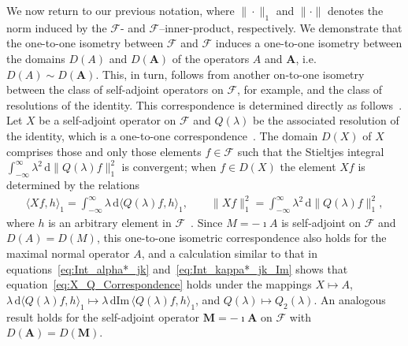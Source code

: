 \documentclass[leqno,onefignum,onetabnum]{siamltex1213}
\renewcommand{\d}{\mathrm{d}}
\newcommand{\Mb}{\mathbf{M}}
\newcommand{\Ab}{\mathbf{A}}
\newcommand{\Fc}{\mathcal{F}}
\newcommand{\Fs}{\mathscr{F}}
\begin{document}
We now return to our previous notation, where $\|\cdot\|_1$ and $\|\cdot\|$
denotes the norm induced by the $\Fs$- and $\Fc$--inner-product, 
respectively. We demonstrate that the one-to-one isometry between
$\Fs$ and $\Fc$ induces a one-to-one isometry between the domains
$D(A)$ and $D(\Ab)$ of the operators $A$ and $\Ab$,
i.e. $D(A)\sim D(\Ab)$. This, in turn, follows from another on-to-one
isometry between the class of self-adjoint operators on $\Fs$, for
example, and the class of resolutions of the identity. This 
correspondence is determined directly as follows~\cite{Stone:64}. Let
$X$ be a self-adjoint operator on $\Fs$ and $Q(\lambda)$ be the associated
resolution of the identity, which is a one-to-one
correspondence~\cite{Stone:64}. The domain $D(X)$ of $X$ comprises
those and only 
those elements $f\in\Fs$ such that the Stieltjes integral
$\int_{-\infty}^\infty\lambda^2\,\d\|Q(\lambda)f\|_1^2$ is convergent; when $f\in D(X)$ the element
$Xf$ is determined by the relations    
%
\begin{align}%
  \langle Xf,h\rangle_1=\int_{-\infty}^\infty\lambda\,\d\langle Q(\lambda)f,h\rangle_1, \qquad
  \|Xf\|_1^2=\int_{-\infty}^\infty\lambda^2\,\d\|Q(\lambda)f\|_1^2,
\end{align}
%
where $h$ is an arbitrary element in $\Fs$~\cite{Stone:64}. Since
$M=-\imath A$ is 
self-adjoint on $\Fs$ and $D(A)=D(M)$, this one-to-one isometric
correspondence also holds for the maximal normal operator $A$, and a
calculation similar to that in equations~\eqref{eq:Int_alpha*_jk}
and~\eqref{eq:Int_kappa*_jk_Im} shows that
equation~\eqref{eq:X_Q_Correspondence} holds under the mappings
$X\mapsto A$, 
$\lambda\,\d\langle Q(\lambda)f,h\rangle_1\mapsto\lambda\,\d\text{Im}\,\langle Q(\lambda)f,h\rangle_1$, and $Q(\lambda)\mapsto Q_2(\lambda)$. An 
analogous result holds 
for the self-adjoint operator $\Mb=-\imath\Ab$ on $\Fc$ with
$D(\Ab)=D(\Mb)$.
\end{document}
